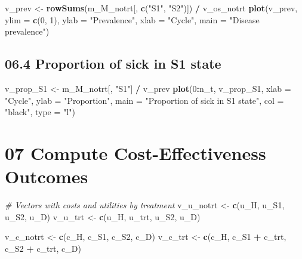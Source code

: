 \documentclass[]{article}
\newenvironment{Shaded}{\begin{snugshade}}{\end{snugshade}}
\newcommand{\KeywordTok}[1]{\textcolor[rgb]{0.13,0.29,0.53}{\textbf{#1}}}
\newcommand{\DataTypeTok}[1]{\textcolor[rgb]{0.13,0.29,0.53}{#1}}
\newcommand{\DecValTok}[1]{\textcolor[rgb]{0.00,0.00,0.81}{#1}}
\newcommand{\StringTok}[1]{\textcolor[rgb]{0.31,0.60,0.02}{#1}}
\newcommand{\CommentTok}[1]{\textcolor[rgb]{0.56,0.35,0.01}{\textit{#1}}}
\newcommand{\OperatorTok}[1]{\textcolor[rgb]{0.81,0.36,0.00}{\textbf{#1}}}
\newcommand{\NormalTok}[1]{#1}
\begin{document}
\begin{Shaded}
\begin{Highlighting}[]
\NormalTok{v_prev <-}\StringTok{ }\KeywordTok{rowSums}\NormalTok{(m_M_notrt[, }\KeywordTok{c}\NormalTok{(}\StringTok{"S1"}\NormalTok{, }\StringTok{"S2"}\NormalTok{)]) }\OperatorTok{/}\StringTok{ }\NormalTok{v_os_notrt}
\KeywordTok{plot}\NormalTok{(v_prev,}
     \DataTypeTok{ylim =} \KeywordTok{c}\NormalTok{(}\DecValTok{0}\NormalTok{, }\DecValTok{1}\NormalTok{),}
     \DataTypeTok{ylab =} \StringTok{"Prevalence"}\NormalTok{,}
     \DataTypeTok{xlab =} \StringTok{"Cycle"}\NormalTok{,}
     \DataTypeTok{main =} \StringTok{"Disease prevalence"}\NormalTok{)}
\end{Highlighting}
\end{Shaded}

\subsection{06.4 Proportion of sick in S1
state}\label{proportion-of-sick-in-s1-state}

\begin{Shaded}
\begin{Highlighting}[]
\NormalTok{v_prop_S1 <-}\StringTok{ }\NormalTok{m_M_notrt[, }\StringTok{"S1"}\NormalTok{] }\OperatorTok{/}\StringTok{ }\NormalTok{v_prev}
\KeywordTok{plot}\NormalTok{(}\DecValTok{0}\OperatorTok{:}\NormalTok{n_t, v_prop_S1,}
     \DataTypeTok{xlab =} \StringTok{"Cycle"}\NormalTok{, }
     \DataTypeTok{ylab =} \StringTok{"Proportion"}\NormalTok{, }
     \DataTypeTok{main =} \StringTok{"Proportion of sick in S1 state"}\NormalTok{, }
     \DataTypeTok{col  =} \StringTok{"black"}\NormalTok{, }\DataTypeTok{type =} \StringTok{"l"}\NormalTok{)}
\end{Highlighting}
\end{Shaded}

\section{07 Compute Cost-Effectiveness
Outcomes}\label{compute-cost-effectiveness-outcomes}

\begin{Shaded}
\begin{Highlighting}[]
\CommentTok{# Vectors with costs and utilities by treatment}
\NormalTok{v_u_notrt   <-}\StringTok{ }\KeywordTok{c}\NormalTok{(u_H, u_S1,  u_S2, u_D)}
\NormalTok{v_u_trt     <-}\StringTok{ }\KeywordTok{c}\NormalTok{(u_H, u_trt, u_S2, u_D)}

\NormalTok{v_c_notrt   <-}\StringTok{ }\KeywordTok{c}\NormalTok{(c_H, c_S1, c_S2, c_D)}
\NormalTok{v_c_trt     <-}\StringTok{ }\KeywordTok{c}\NormalTok{(c_H, c_S1 }\OperatorTok{+}\StringTok{ }\NormalTok{c_trt, c_S2 }\OperatorTok{+}\StringTok{ }\NormalTok{c_trt, c_D)}
\end{Highlighting}
\end{Shaded}
\end{document}
